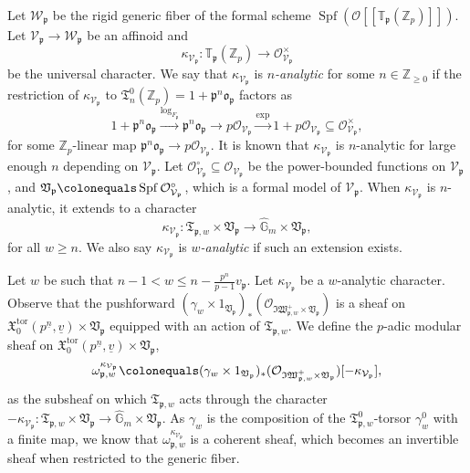 \documentclass[11pt]{amsart}
\theoremstyle{definition} %
\theoremstyle{plain} %
\theoremstyle{remark} %
\newcommand{\GG}{{\mathbb G}}
\newcommand{\TT}{{\mathbb T}}
\newcommand{\ZZ}{{\mathbb Z}}
\newcommand{\cO}{{\mathcal O}}
\newcommand{\cV}{{\mathcal V}}
\newcommand{\cW}{{\mathcal W}}
\newcommand{\frakI}{\mathfrak I}
\newcommand{\frakT}{\mathfrak T}
\newcommand{\frakV}{\mathfrak V}
\newcommand{\frakW}{\mathfrak W}
\newcommand{\frakX}{\mathfrak X}
\newcommand{\frako}{\mathfrak o}
\newcommand{\frakp}{\mathfrak p}
\newcommand{\defeq}{\colonequals} %
\DeclareMathOperator\Spf{Spf} %
\newcommand{\tor}{\mathrm{tor}} %
\begin{document}
Let $\cW_\frakp$ be the rigid generic fiber of the formal scheme $\Spf(\cO[\![\TT_\frakp(\ZZ_p)]\!])$.
Let $\cV_\frakp\rightarrow \cW_\frakp$ be an affinoid and 
\[
 \kappa_{\cV_\frakp}\colon \TT_\frakp(\ZZ_p) \rightarrow \cO_{\cV_\frakp}^\times
\]
be the universal character.
We say that $\kappa_{\cV_\frakp}$ is \emph{$n$-analytic} for some $n\in\ZZ_{\geqslant 0}$ if the restriction of $\kappa_{\cV_\frakp}$ to $\frakT_n^0(\ZZ_p) = 1+\frakp^n\frako_{\frakp}$ factors as 
\[
  1+\frakp^n\frako_{\frakp} \xrightarrow{\log_{F_\frakp}} \frakp^n\frako_{\frakp} \rightarrow p\cO_{\cV_\frakp} \xrightarrow{\exp} 1+p\cO_{\cV_\frakp}\subseteq \cO_{\cV_\frakp}^\times,
\]
for some $\ZZ_p$-linear map $\frakp^n\frako_{\frakp} \rightarrow p\cO_{\cV_\frakp}$. 
It is known that $\kappa_{\cV_\frakp}$ is $n$-analytic for large enough $n$ depending on $\cV_\frakp$.
Let $\cO_{\cV_\frakp}^\circ\subseteq \cO_{\cV_\frakp}$ be the power-bounded functions on ${\cV_\frakp}$, and $\frakV_\frakp\defeq \Spf\cO_{\cV_\frakp}^\circ$, which is a formal model of ${\cV_\frakp}$. 
When $\kappa_{\cV_\frakp}$ is $n$-analytic, it extends to a character
\[
 \kappa_{\cV_\frakp} \colon \frakT_{\frakp,w} \times \frakV_\frakp \rightarrow \widehat{\GG}_m \times \frakV_\frakp,
\]
for all $w\geqslant n$.
We also say $\kappa_{\cV_\frakp}$ is \emph{$w$-analytic} if such an extension exists.

Let $w$ be such that $n-1<w\leqslant n-\frac{p^n}{p-1}v_\frakp$.
Let $\kappa_{\cV_\frakp}$ be a $w$-analytic character.
Observe that the pushforward $(\gamma_{w}\times 1_{\frakV_\frakp})_\ast(\cO_{\frakI\frakW_{\frakp,w}^+\times \frakV_\frakp})$ is a sheaf on $\frakX_0^\tor(p^{\underline{n}},\underline{v})\times \frakV_\frakp$ equipped with an action of $\frakT_{\frakp,w}$.
We define the $p$-adic modular sheaf on $\frakX_0^\tor(p^{\underline{n}},\underline{v})\times \frakV_\frakp$,
\[
 \omega_{\frakp,w}^{\kappa_{\cV_\frakp}} \defeq (\gamma_{w}\times 1_{\frakV_\frakp})_\ast(\cO_{\frakI\frakW_{\frakp,w}^+\times \frakV_\frakp})[-\kappa_{\cV_\frakp}],
\]
as the subsheaf on which $\frakT_{\frakp,w}$ acts through the character $-\kappa_{\cV_\frakp} \colon \frakT_{\frakp,w} \times \frakV_\frakp \rightarrow \widehat{\GG}_m \times \frakV_\frakp$.
As $\gamma_w$ is the composition of the $\frakT_{\frakp,w}^0$-torsor $\gamma_w^0$ with a finite map, we know that  $\omega_{\frakp,w}^{\kappa_{\cV_\frakp}}$ is a coherent sheaf, which becomes an invertible sheaf when restricted to the generic fiber.
\end{document}
